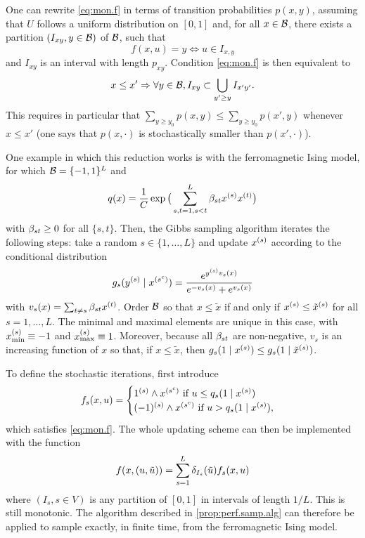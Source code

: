One
can rewrite \cref{eq:mon.f} in terms of transition probabilities
$p(x,y)$, assuming that $U$ follows a uniform distribution on $[0,1]$
and, for all $x\in {\mathcal B}$, there exists a partition
$(I_{xy}, y\in{\mathcal B})$  of ${\mathcal B}$, such that
\[
f(x,u) = y \Leftrightarrow u\in I_{x,y}
\]
and $I_{xy}$ is
an interval with length $p_{xy}$.
 Condition \cref{eq:mon.f} is then
equivalent to
\[
x \leq x' \Rightarrow \forall y\in {\mathcal B}, I_{xy} \subset \bigcup_{y'\geq y}
I_{x'y'}.
\]  
This requires in particular that $\sum_{y\geq y_0}p(x,y) \leq
\sum_{y\geq y_0} p(x',y)$ whenever $x\leq x'$ (one says that $p(x, \cdot)$
is stochastically smaller than $p(x', \cdot)$). %

One example in which this reduction works is with the ferromagnetic Ising
model, for which ${\mathcal B} = \{-1,1\}^L$ and 
$$
q(x) = \frac{1}{C} \exp\big(\sum_{s, t=1, s<t}^L \beta_{st} x^{(s)}
x^{(t)}\big)
$$
with $\beta_{st} \geq 0$ for all $\{s,t\}$. 
Then, the Gibbs sampling algorithm iterates the following steps: take a
random $s\in \{1, \ldots, L\}$ and update $x^{(s)}$ according to the conditional
distribution
$$
g_s(y^{(s)}\mid x^{(s^c)}) = \frac{e^{y^{(s)} v_s(x)}}{e^{-v_s(x)} + e^{v_s(x)}}
$$
with $v_s(x) = \sum_{t\neq s}
\beta_{st} x^{(t)}$. Order ${\mathcal B}$ so that $x\leq \tilde x$ if and only if
$x^{(s)}\leq \tilde x^{(s)}$ for all $s=1, \ldots, L$. The minimal and maximal elements are
unique in this case, with $x_{\mathrm{min}}^{(s)}\equiv -1$ and $x_{\mathrm{max}}^{(s)}\equiv 1$. Moreover,
because all $\beta_{st}$ are non-negative, $v_s$ is an increasing function
of $x$ so that, if $x\leq \tilde x$, then $g_s(1\mid x^{(s)}) \leq
g_s(1\mid \tilde x^{(s)})$. 

To define the stochastic iterations, first introduce
\[
f_s(x,u) =
\begin{cases}
 1^{(s)}\wedge x^{(s^c)} \text{ if }  u \leq q_s(1\mid x^{(s)})\\
(-1)^{(s)}\wedge x^{(s^c)} \text{ if } u > q_s(1\mid x^{(s)}),
\end{cases}
\]
which satisfies \cref{eq:mon.f}. The whole updating scheme
can then be implemented with the function
$$
f(x, (u,\tilde u)) = \sum_{s=1}^L \delta_{I_s}(\tilde u) f_s(x,u)
$$
where $(I_s, s\in V)$ is any partition of $[0,1]$ in intervals of
length $1/L$. This is still monotonic. The algorithm described in
 \cref{prop:perf.samp.alg} can therefore be applied to 
sample exactly, in finite time, from the ferromagnetic Ising model.
